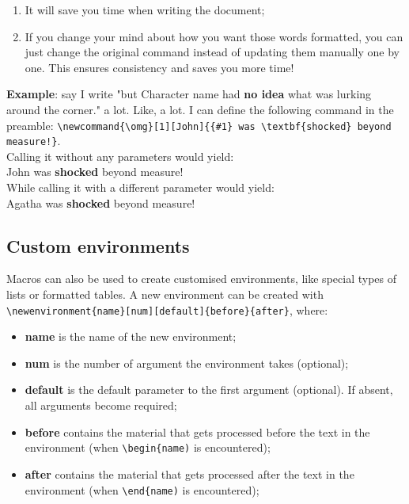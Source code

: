 \documentclass[12pt, letterpaper]{article} %
\newcommand{\omg}[1][John]{{#1} was \textbf{shocked} beyond measure!}
\begin{document}
\begin{enumerate}
	\item It will save you time when writing the document;
	\item If you change your mind about how you want those words formatted,
	you can just change the original command instead of updating them manually
	one by one. This ensures consistency and saves you more time!
\end{enumerate}

\textbf{Example}: say I write "but {Character name} had \textbf{no idea} what 
was lurking around the corner." a lot. Like, a lot. I can define the following 
command in the preamble: 
\verb+\newcommand{\omg}[1][John]{{#1} was \textbf{shocked} beyond measure!}+. \\
Calling it without any parameters would yield:\\
\omg
\\
While calling it with a different parameter would yield:\\
\omg[Agatha]

\clearpage

\subsection{Custom environments}

Macros can also be used to create customised environments, like special types
of lists or formatted tables. A new environment can be created with\\
\verb+\newenvironment{name}[num][default]{before}{after}+, where:

\begin{itemize}
	\item \textbf{name} is the name of the new environment;
	\item \textbf{num} is the number of argument the environment takes 
	(optional);
	\item \textbf{default} is the default parameter to the first argument 
	(optional). If absent, all arguments become required;
	\item \textbf{before} contains the material that gets processed before 
	the text in the environment (when \verb+\begin{name)+ is encountered);
	\item \textbf{after} contains the material that gets processed after 
	the text in the environment (when \verb+\end{name)+ is encountered);
\end{itemize}
\end{document}
